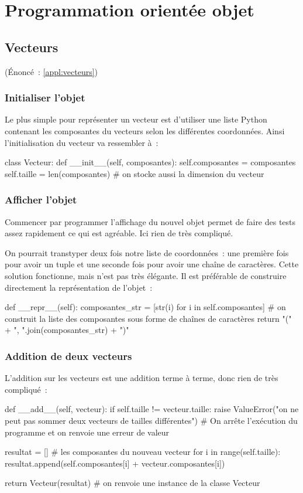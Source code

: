 \section{Programmation orientée objet}

	\subsection{Vecteurs} \label{corr:vecteurs} (Énoncé~: \ref{appl:vecteurs})
		
		\subsubsection{Initialiser l'objet}
		Le plus simple pour représenter un vecteur est d'utiliser une liste Python contenant les composantes du vecteurs selon les différentes coordonnées. Ainsi l'initialisation du vecteur va ressembler à~:
		\begin{pythoncode}
			class Vecteur:
				def __init__(self, composantes):
					self.composantes = composantes
					self.taille = len(composantes) # on stocke aussi la dimension du vecteur
		\end{pythoncode}
		
		\subsubsection{Afficher l'objet}
		Commencer par programmer l'affichage du nouvel objet permet de faire des tests assez rapidement ce qui est agréable. Ici rien de très compliqué.
		
		On pourrait transtyper deux fois notre liste de coordonnées~: une première fois pour avoir un tuple et une seconde fois pour avoir une chaîne de caractères. Cette solution fonctionne, mais n'est pas très élégante. Il est préférable de construire directement la représentation de l'objet~:
		\begin{pythoncode}
			def __repr__(self):
				composantes_str = [str(i) for i in self.composantes] # on construit la liste des composantes sous forme de chaînes de caractères
				return "(" + ", ".join(composantes_str) + ")"
		\end{pythoncode}
		
		\subsubsection{Addition de deux vecteurs}
		L'addition sur les vecteurs est une addition terme à terme, donc rien de très compliqué~:
		\begin{pythoncode}
			def __add__(self, vecteur):
				if self.taille != vecteur.taille:
					raise ValueError("on ne peut pas sommer deux vecteurs de tailles différentes") # On arrête l'exécution du programme et on renvoie une erreur de valeur
				
				resultat = [] # les composantes du nouveau vecteur
				for i in range(self.taille):
					resultat.append(self.composantes[i] + vecteur.composantes[i])
				
				return Vecteur(resultat) # on renvoie une instance de la classe Vecteur
		\end{pythoncode}
		
